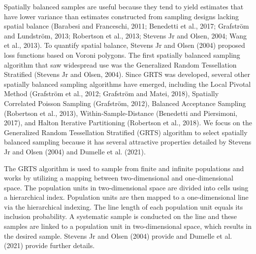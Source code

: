 \documentclass[]{elsarticle} %
\begin{document}
Spatially balanced samples are useful because they tend to yield
estimates that have lower variance than estimates constructed from
sampling designs lacking spatial balance (Barabesi and Franceschi, 2011;
Benedetti et al., 2017; Grafström and Lundström, 2013; Robertson et al.,
2013; Stevens Jr and Olsen, 2004; Wang et al., 2013). To quantify
spatial balance, Stevens Jr and Olsen (2004) proposed loss functions
based on Voroni polygons. The first spatially balanced sampling
algorithm that saw widespread use was the Generalized Random
Tessellation Stratified (Stevens Jr and Olsen, 2004). Since GRTS was
developed, several other spatially balanced sampling algorithms have
emerged, including the Local Pivotal Method (Grafström et al., 2012;
Grafström and Matei, 2018), Spatially Correlated Poisson Sampling
(Grafström, 2012), Balanced Acceptance Sampling (Robertson et al.,
2013), Within-Sample-Distance (Benedetti and Piersimoni, 2017), and
Halton Iterative Partitioning (Robertson et al., 2018). We focus on the
Generalized Random Tessellation Stratified (GRTS) algorithm to select
spatially balanced sampling because it has several attractive properties
detailed by Stevens Jr and Olsen (2004) and Dumelle et al. (2021).

The GRTS algorithm is used to sample from finite and infinite
populations and works by utilizing a mapping between two-dimensional and
one-dimensional space. The population units in two-dimensional space are
divided into cells using a hierarchical index. Population units are then
mapped to a one-dimensional line via the hierarchical indexing. The line
length of each population unit equals its inclusion probability. A
systematic sample is conducted on the line and these samples are linked
to a population unit in two-dimensional space, which results in the
desired sample. Stevens Jr and Olsen (2004) provide and Dumelle et al.
(2021) provide further details.
\end{document}
